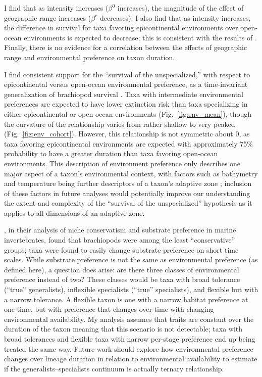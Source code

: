 \documentclass[11pt]{article}
\begin{document}
I find that as intensity increases (\(\beta^{0}\) increases), the magnitude of the effect of geographic range increases (\(\beta^{r}\) decreases). I also find that as intensity increases, the difference in survival for taxa favoring epicontinental environments over open-ocean environments is expected to decrease; this is consistent with the results of \citet{Miller2009a}. Finally, there is no evidence for a correlation between the effects of geographic range and environmental preference on taxon duration. 

I find consistent support for the ``survival of the unspecialized,'' with respect to epicontinental versus open-ocean environmental preference, as a time-invariant generalization of brachiopod survival \citep{Simpson1944}. Taxa with intermediate environmental preferences are expected to have lower extinction risk than taxa specializing in either epicontinental or open-ocean environments (Fig.~\ref{fig:env_mean}), though the curvature of the relationship varies from rather shallow to very peaked (Fig.~\ref{fig:env_cohort}). However, this relationship is not symmetric about 0, as taxa favoring epicontinental environments are expected with approximately 75\% probability to have a greater duration than taxa favoring open-ocean environments. This description of environment preference only describes one major aspect of a taxon's environmental context, with factors such as bathymetry and temperature being further descriptors of a taxon's adaptive zone \citep{Nurnberg2013a,Harnik2013,Harnik2011,Heim2011}; inclusion of these factors in future analyses would potentially improve our understanding the extent and complexity of the ``survival of the unspecialized'' hypothesis as it applies to all dimensions of an adaptive zone.

\citet{Hopkins2014a}, in their analysis of niche conservatism and substrate preference in marine invertebrates, found that brachiopods were among the least ``conservative'' groups; taxa were found to easily change substrate preference on short time scales. While substrate preference is not the same as environmental preference (as defined here), a question does arise: are there three classes of environmental preference instead of two? These classes would be taxa with broad tolerance (``true'' generalists), inflexible specialists (``true'' specialists), and flexible but with a narrow tolerance. A flexible taxon is one with a narrow habitat preference at one time, but with preference that changes over time with changing environmental availability. My analysis assumes that traits are constant over the duration of the taxon meaning that this scenario is not detectable; taxa with broad tolerances and flexible taxa with narrow per-stage preference end up being treated the same way. Future work should explore how environmental preference changes over lineage duration in relation to environmental availability to estimate if the generalists--specialists continuum is actually ternary relationship.
\end{document}
